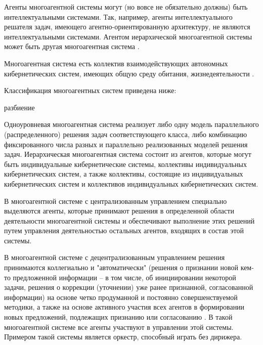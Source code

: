 \begin{SCn}
\end{SCn}


Агенты многоагентной системы могут (но вовсе не обязательно должны) быть интеллектуальными системами. 
Так, например, агенты интеллектуального решателя задач, имеющего агентно-ориентированную архитектуру, не являются интеллектуальными системами. 
Агентом иерархической многоагентной системы может быть другая многоагентная система .

Многоагентная система есть коллектив взаимодействующих автономных кибернетических систем, имеющих общую среду обитания, жизнедеятельности . 

Классификация многоагентных систем приведена ниже:

\begin{SCn}
\begin{scnrelfromset}{разбиение}
\end{scnrelfromset}
\end{SCn}

Одноуровневая многоагентная система реализует либо одну модель параллельного (распределенного) решения задач соответствующего класса, либо комбинацию фиксированного числа разных и параллельно реализованных моделей решения задач. 
Иерархическая многоагентная система состоит из агентов, которые могут быть индивидуальные кибернетические системы, коллективы индивидуальных кибернетических систем, а также коллективы, состоящие из индивидуальных кибернетических систем и коллективов индивидуальных кибернетических систем.

В многоагентной системе с централизованным управлением специально выделяются агенты, которые принимают решения в определенной области деятельности многоагентной системы и обеспечивают выполнение этих решений путем управления деятельностью остальных агентов, входящих в состав этой системы.

В многоагентной системе с децентрализованным управлением решения принимаются коллегиально и "автоматически"{} (решения о признании новой кем-то предложенной информации – в том числе, об инициировании некоторой задачи, решения о коррекции (уточнении) уже ранее признанной, согласованной информации) на основе четко продуманной и постоянно совершенствуемой методики, а также на основе активного участия всех агентов в формировании новых предложений, подлежащих признанию или согласованию . 
В такой многоагентной системе все агенты участвуют в управлении этой системы. 
Примером такой системы является оркестр, способный играть без дирижера.



